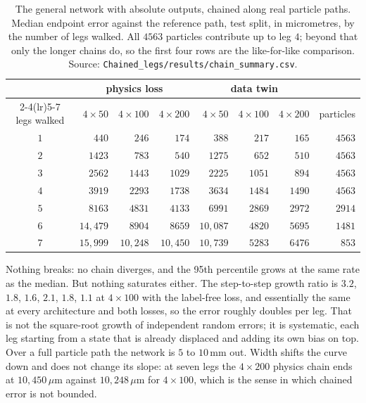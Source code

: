 \documentclass[11pt,a4paper]{article}
\newcommand{\um}{\ensuremath{\,\mu\mathrm{m}}}
\newcommand{\mm}{\ensuremath{\,\mathrm{mm}}}
\begin{document}
\begin{table}[tbp]
  \centering
  \caption{The general network with absolute outputs, chained along real
  particle paths. Median endpoint error against the reference path, test split,
  in micrometres, by the number of legs walked. All $4563$ particles contribute
  up to leg $4$; beyond that only the longer chains do, so the first four rows
  are the like-for-like comparison. Source:
  \texttt{Chained\_legs/results/chain\_summary.csv}.}
  \label{tab:chains-abs}
  \small
  \begin{tabular}{crrrrrrr}
    \toprule
    & \multicolumn{3}{c}{physics loss} & \multicolumn{3}{c}{data twin} & \\
    \cmidrule(lr){2-4}\cmidrule(lr){5-7}
    legs walked & $4\times50$ & $4\times100$ & $4\times200$
                & $4\times50$ & $4\times100$ & $4\times200$ & particles \\
    \midrule
    $1$ & $440$      & $246$      & $174$      & $388$      & $217$   & $165$   & $4563$ \\
    $2$ & $1423$     & $783$      & $540$      & $1275$     & $652$   & $510$   & $4563$ \\
    $3$ & $2562$     & $1443$     & $1029$     & $2225$     & $1051$  & $894$   & $4563$ \\
    $4$ & $3919$     & $2293$     & $1738$     & $3634$     & $1484$  & $1490$  & $4563$ \\
    $5$ & $8163$     & $4831$     & $4133$     & $6991$     & $2869$  & $2972$  & $2914$ \\
    $6$ & $14{,}479$ & $8904$     & $8659$     & $10{,}087$ & $4820$  & $5695$  & $1481$ \\
    $7$ & $15{,}999$ & $10{,}248$ & $10{,}450$ & $10{,}739$ & $5283$  & $6476$  & $853$ \\
    \bottomrule
  \end{tabular}
\end{table}

Nothing breaks: no chain diverges, and the 95th percentile grows at the same
rate as the median. But nothing saturates either. The step-to-step growth ratio
is $3.2$, $1.8$, $1.6$, $2.1$, $1.8$, $1.1$ at $4 \times 100$ with the
label-free loss, and essentially the same at every architecture and both losses,
so the error roughly doubles per leg. That is not the square-root growth of
independent random errors; it is systematic, each leg starting from a state that
is already displaced and adding its own bias on top. Over a full particle path
the network is $5$ to $10\mm$ out. Width shifts the curve down and does not
change its slope: at seven legs the $4 \times 200$ physics chain ends at
$10{,}450\um$ against $10{,}248\um$ for $4 \times 100$, which is the sense in
which chained error is not bounded.
\end{document}
